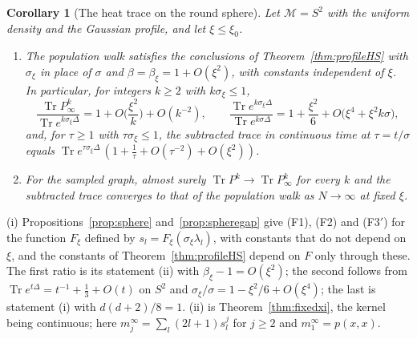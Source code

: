 \documentclass[11pt,a4paper]{article}
\makeatletter
\theoremstyle{stmt}
\newtheorem{corollary}[theorem]{Corollary}
\theoremstyle{defn}
\theoremstyle{rmk}
\renewenvironment{proof}[1][\proofname]{\par\pushQED{\qed}\normalfont\topsep6\p@\@plus6\p@\relax
  \trivlist\item[\hskip\labelsep{\sffamily\itshape\small #1.}]\ignorespaces}{\popQED\endtrivlist\@endpefalse}
\numberwithin{equation}{section}
\DeclareMathOperator{\Tr}{Tr}
\newcommand{\M}{\mathcal{M}}
\makeatother
\begin{document}
{\begin{corollary}[The heat trace on the round sphere]\label{cor:sphere}
Let $\M=S^2$ with the uniform density and the Gaussian profile, and let $\xi\le\xi_0$.
\begin{enumerate}[label=\textup{(\roman*)}]
\item The population walk satisfies the conclusions of Theorem~\ref{thm:profileHS} with $\sigma_\xi$ in place of $\sigma$ and $\beta=\beta_\xi=1+O(\xi^2)$, with constants independent of $\xi$. In particular, for integers $k\ge2$ with $k\sigma_\xi\le1$,
\[
\frac{\Tr P_\infty^k}{\Tr e^{k\sigma_\xi\Delta}}=1+O\Big(\frac{\xi^2}{k}\Big)+O(k^{-2}),\qquad\frac{\Tr e^{k\sigma_\xi\Delta}}{\Tr e^{k\sigma\Delta}}=1+\frac{\xi^2}{6}+O\big(\xi^4+\xi^2k\sigma\big),
\]
and, for $\tau\ge1$ with $\tau\sigma_\xi\le1$, the subtracted trace in continuous time at $\tau=t/\sigma$ equals $\Tr e^{\tau\sigma_\xi\Delta}\,(1+\tfrac1\tau+O(\tau^{-2})+O(\xi^2))$.
\item For the sampled graph, almost surely $\Tr P^k\to\Tr P_\infty^k$ for every $k$ and the subtracted trace converges to that of the population walk as $N\to\infty$ at fixed $\xi$.
\end{enumerate}
\end{corollary}

\begin{proof}
(i) Propositions~\ref{prop:sphere} and~\ref{prop:spheregap} give \textup{(F1)}, \textup{(F2)} and \textup{(F3$'$)} for the function $F_\xi$ defined by $s_l=F_\xi(\sigma_\xi\lambda_l)$, with constants that do not depend on $\xi$, and the constants of Theorem~\ref{thm:profileHS} depend on $F$ only through these. The first ratio is its statement (ii) with $\beta_\xi-1=O(\xi^2)$; the second follows from $\Tr e^{t\Delta}=t^{-1}+\tfrac13+O(t)$ on $S^2$ and $\sigma_\xi/\sigma=1-\xi^2/6+O(\xi^4)$; the last is statement (i) with $d(d+2)/8=1$. (ii) is Theorem~\ref{thm:fixedxi}, the kernel being continuous; here $m_j^\infty=\sum_l(2l+1)s_l^j$ for $j\ge2$ and $m_1^\infty=p(x,x)$.
\end{proof}

}
\end{document}
